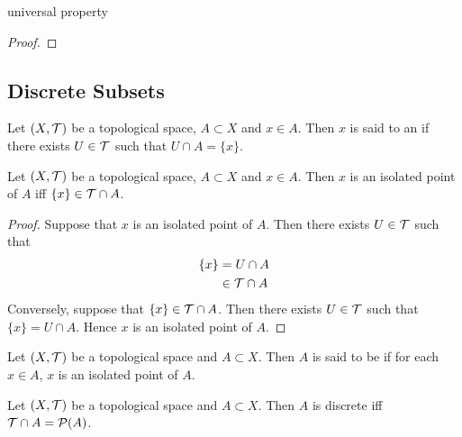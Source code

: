 \documentclass{book}
\begin{document}
\begin{ex} 
	universal property
\end{ex}

\begin{proof}
\end{proof}





















\subsection{Discrete Subsets}

\begin{defn}
	Let $(X, \mathcal{T})$ be a topological space, $A \subset X$ and $x \in A$. Then $x$ is said to an  if there exists $U \in \mathcal{T}$ such that $U \cap A = \{x\}$. 
\end{defn}

\begin{ex}
	Let $(X, \mathcal{T})$ be a topological space, $A \subset X$ and $x \in A$. Then $x$ is an isolated point of $A$ iff $\{x\} \in \mathcal{T} \cap A$.
\end{ex}

\begin{proof}
	Suppose that $x$ is an isolated point of $A$. Then there exists $U \in \mathcal{T}$ such that 
	\begin{align*}
		\{x\}
		& = U \cap A \\
		& \in \mathcal{T} \cap A
	\end{align*} 
	Conversely, suppose that $\{x\} \in \mathcal{T} \cap A$. Then there exists $U \in \mathcal{T}$ such that $\{x\} = U \cap A$. Hence $x$ is an isolated point of $A$.
\end{proof}

\begin{defn}
	Let $(X, \mathcal{T})$ be a topological space and $A \subset X$. Then $A$ is said to be  if for each $x \in A$, $x$ is an isolated point of $A$.
\end{defn}

\begin{ex}
	Let $(X, \mathcal{T})$ be a topological space and $A \subset X$. Then $A$ is discrete iff $\mathcal{T} \cap A = \mathcal{P}(A)$. 
\end{ex}
\end{document}
